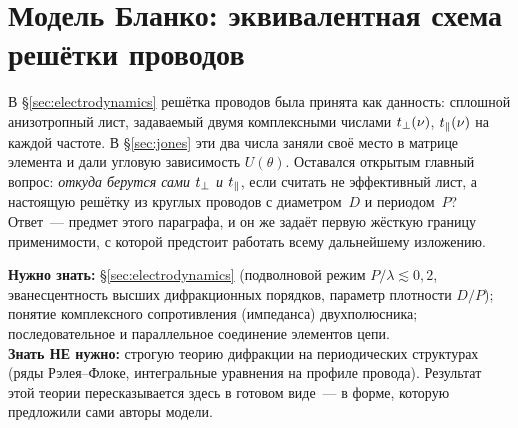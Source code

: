 %
%
\section{Модель Бланко: эквивалентная схема решётки проводов}
\label{sec:blanco}

В §\ref{sec:electrodynamics} решётка проводов была принята как данность: сплошной анизотропный
лист, задаваемый двумя комплексными числами $t_{\perp}(\nu)$, $t_{\parallel}(\nu)$ на каждой частоте. В
§\ref{sec:jones} эти два числа заняли своё место в матрице элемента и дали угловую зависимость
$U(\theta)$. Оставался открытым главный вопрос: \emph{откуда берутся сами $t_{\perp}$ и $t_{\parallel}$}, если
считать не эффективный лист, а настоящую решётку из круглых проводов с диаметром~$D$ и
периодом~$P$? Ответ~--- предмет этого параграфа, и он же задаёт первую жёсткую границу
применимости, с которой предстоит работать всему дальнейшему изложению.

\begin{tcolorbox}[enhanced,colback=cPanel,colframe=cGrid,boxrule=0.8pt,arc=2pt,
                  title={\bfseries\color{cAccent} Пререквизиты},coltitle=cAccent,
                  attach boxed title to top left={xshift=6pt,yshift=-2pt},
                  boxed title style={colback=cPanel,boxrule=0pt,arc=0pt},top=10pt]
\textbf{Нужно знать:} §\ref{sec:electrodynamics} (подволновой режим $P/\lambda\lesssim0{,}2$,
эванесцентность высших дифракционных порядков, параметр плотности $D/P$); понятие комплексного
сопротивления (импеданса) двухполюсника; последовательное и параллельное соединение элементов
цепи.\\[0.3em]
\textbf{Знать НЕ нужно:} строгую теорию дифракции на периодических структурах (ряды
Рэлея--Флоке, интегральные уравнения на профиле провода). Результат этой теории пересказывается
здесь в готовом виде~--- в форме, которую предложили сами авторы модели.
\end{tcolorbox}

